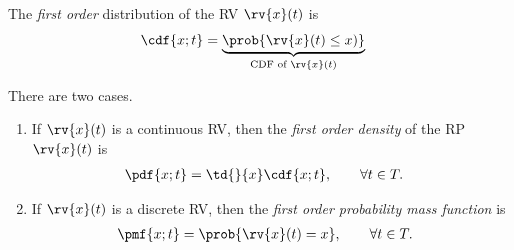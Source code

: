 \begin{mydefinition}
    The \emph{first order} distribution of the RV $\rv{x}(t)$ is  
    \begin{align}
        \cdf{x; t} &= \underbrace{\prob{\rv{x}(t) \leq x)}}_{\text{CDF of } \rv{x}(t)}
    \end{align}
\end{mydefinition}
\begin{mydefinition}
    There are two cases.
    \begin{enumerate}
        \item If $\rv{x}(t)$ is a continuous RV, then the \emph{first order density} of the RP $\rv{x}(t)$ is 
        \begin{align}
            \pdf{x; t} &= \td{}{x}\cdf{x; t}, \qquad \forall t\in T.
        \end{align}
            
        \item If $\rv{x}(t)$ is a discrete RV, then the \emph{first order probability mass function} is
        \begin{align}
            \pmf{x; t} &= \prob{\rv{x}(t) = x}, \qquad \forall t\in T.
        \end{align}
    \end{enumerate}
\end{mydefinition}

